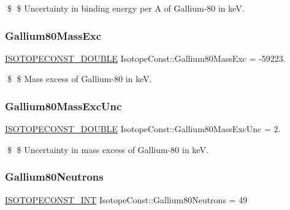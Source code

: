 \$ \$ Uncertainty in binding energy per A of Gallium-\/80 in keV. \mbox{\label{group___isotope_const-_gallium-_ga80_gae0ccc1049def49696db553f7ab048af9}} 
\subsubsection{\texorpdfstring{Gallium80\+Mass\+Exc}{Gallium80MassExc}}
{\footnotesize\ttfamily \mbox{\hyperlink{group___isotope_const-_macros_ga8f45a7272ce02c0b4c65c44636ed719a}{I\+S\+O\+T\+O\+P\+E\+C\+O\+N\+S\+T\+\_\+\+D\+O\+U\+B\+LE}} Isotope\+Const\+::\+Gallium80\+Mass\+Exc = -\/59223.}

\$ \$ Mass excess of Gallium-\/80 in keV. \mbox{\label{group___isotope_const-_gallium-_ga80_ga5eb8fa0bdd2ab07796ac925915ef3790}} 
\subsubsection{\texorpdfstring{Gallium80\+Mass\+Exc\+Unc}{Gallium80MassExcUnc}}
{\footnotesize\ttfamily \mbox{\hyperlink{group___isotope_const-_macros_ga8f45a7272ce02c0b4c65c44636ed719a}{I\+S\+O\+T\+O\+P\+E\+C\+O\+N\+S\+T\+\_\+\+D\+O\+U\+B\+LE}} Isotope\+Const\+::\+Gallium80\+Mass\+Exc\+Unc = 2.}

\$ \$ Uncertainty in mass excess of Gallium-\/80 in keV. \mbox{\label{group___isotope_const-_gallium-_ga80_ga64612795577ea2d031b7b77fd7d25abe}} 
\subsubsection{\texorpdfstring{Gallium80\+Neutrons}{Gallium80Neutrons}}
{\footnotesize\ttfamily \mbox{\hyperlink{group___isotope_const-_macros_ga5f18360b3e99483a35c32d789e62621c}{I\+S\+O\+T\+O\+P\+E\+C\+O\+N\+S\+T\+\_\+\+I\+NT}} Isotope\+Const\+::\+Gallium80\+Neutrons = 49}

